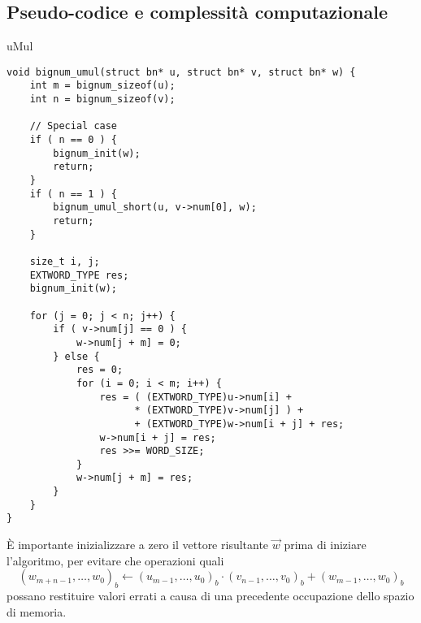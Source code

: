 %
\subsection{Pseudo-codice e complessità computazionale}
%

\begin{algorithm}[H]
	\caption{uMul}
	\label{alg:uMul}
	\DontPrintSemicolon
\end{algorithm}

\begin{lstlisting}[basicstyle=\ttfamily\small, backgroundcolor=\color{bgCode}]
void bignum_umul(struct bn* u, struct bn* v, struct bn* w) {
    int m = bignum_sizeof(u);
    int n = bignum_sizeof(v);
    
    // Special case
    if ( n == 0 ) {
        bignum_init(w);
        return;
    }
    if ( n == 1 ) {
        bignum_umul_short(u, v->num[0], w);
        return;
    }
    
    size_t i, j;
    EXTWORD_TYPE res;
    bignum_init(w);
    
    for (j = 0; j < n; j++) {
        if ( v->num[j] == 0 ) {
            w->num[j + m] = 0;
        } else {
            res = 0;
            for (i = 0; i < m; i++) {
                res = ( (EXTWORD_TYPE)u->num[i] +
                      * (EXTWORD_TYPE)v->num[j] ) +
                      + (EXTWORD_TYPE)w->num[i + j] + res;
                w->num[i + j] = res;
                res >>= WORD_SIZE;
            }
            w->num[j + m] = res;
        }
    }
}
\end{lstlisting}

È importante inizializzare a zero il vettore risultante $\vec{w}$ prima di iniziare l'algoritmo, per evitare che operazioni quali $$\left(w_{m+n-1}, \dots, w_0\right)_b \gets \left(u_{m-1}, \dots, u_0\right)_b \cdot \left(v_{n-1}, \dots, v_0\right)_b + \left(w_{m-1}, \dots, w_0\right)_b$$ possano restituire valori errati a causa di una precedente occupazione dello spazio di memoria.

